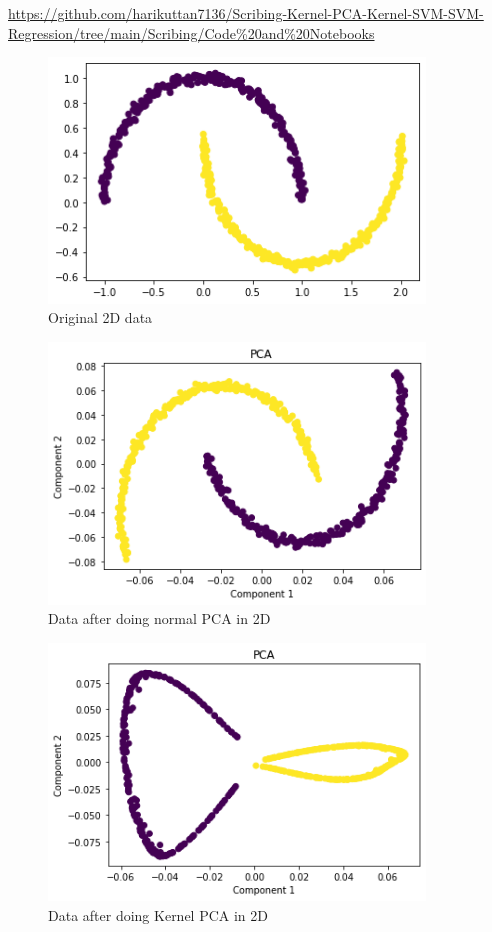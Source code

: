 \documentclass[../main.tex]{subfiles}
\begin{document}
\url {https://github.com/harikuttan7136/Scribing-Kernel-PCA-Kernel-SVM-SVM-Regression/tree/main/Scribing/Code%20and%20Notebooks}

    \begin{figure}[htp]
    \centering
    \includegraphics[width=10cm]{H2.png}
    \caption{Original 2D data}
    \label{Original 2D data}
    \end{figure}
    \begin{figure}[htp]
    \centering
    \includegraphics[width=10cm]{H3.png}
    \caption{Data after doing normal PCA in 2D}
    \label{Data after doing normal PCA in 2D}
    \end{figure}
\begin{figure}[htp]
    \centering
    \includegraphics[width=10cm]{H4.png}
    \caption{Data after doing Kernel PCA in 2D}
    \label{Data after doing Kernel PCA in 2D}
    \end{figure}
\end{document}
